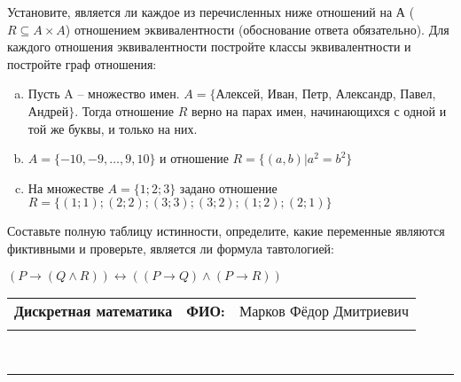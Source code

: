 \documentclass[10pt]{exam}
\newcommand{\class}{Дискретная математика}
\newcommand{\examdate}{}
\begin{document}
\begin{questions}
\question
Установите, является ли каждое из перечисленных ниже отношений на А ($R \subseteq A \times A$) отношением эквивалентности (обоснование ответа обязательно). Для каждого отношения эквивалентности постройте классы 
эквивалентности и постройте граф отношения:
\begin{enumerate} [a)]\setcounter{enumi}{0}
\item Пусть A – множество имен. $A = \{ $Алексей, Иван, Петр, Александр, Павел, Андрей$ \}$. Тогда отношение $R$ верно на парах имен, начинающихся с одной и той же буквы, и только на них.
\item $A = \{-10, -9, … , 9, 10\}$ и отношение $ R = \{(a,b)|a^{2} = b^{2}\}$
\item На множестве $A = \{1; 2; 3\}$ задано отношение $R = \{(1; 1); (2; 2); (3; 3); (3; 2); (1; 2); (2; 1)\}$
\end{enumerate}\question Составьте полную таблицу истинности, определите, какие переменные являются фиктивными и проверьте, является ли формула тавтологией:

$(P \rightarrow (Q \land R)) \leftrightarrow ((P \rightarrow Q) \land (P \rightarrow R))$

\end{questions}
\newpage
\begin{flushright}
\begin{tabular}{p{2.8in} r l}
\textbf{\class} & \textbf{ФИО:} &Марков Фёдор Дмитриевич
\\

\textbf{\examdate} &&\\
\end{tabular}\\
\end{flushright}
\rule[1ex]{\textwidth}{.1pt}
\end{document}
